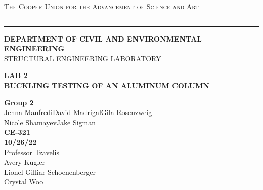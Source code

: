 \begin{titlepage}
    \begin{center}
    {{\Large{\textsc{The Cooper Union for the Advancement of Science and Art}}}} \rule[0.1cm]{15.8cm}{0.1mm}
    \rule[0.5cm]{15.8cm}{0.6mm}
    {\small{\bf DEPARTMENT OF CIVIL AND ENVIRONMENTAL ENGINEERING}}\\
    {\footnotesize{STRUCTURAL ENGINEERING LABORATORY}}
    \end{center}
    \vspace{15mm}
    \begin{center}
    {\large{\bf LAB 2\\}}
    \vspace{5mm}
    {\Large{\bf BUCKLING TESTING OF AN ALUMINUM COLUMN}}
    \end{center}
    \vspace{35mm}
    \par
    \noindent
    \hfill
    \vspace{20mm}
    \begin{center}
    {\large{ {\bf Group 2} \\ { Jenna Manfredi\hspace{5mm}David Madrigal\hspace{5mm}Gila Rosenzweig\\Nicole Shamayev\hspace{5mm}Jake Sigman}}}
    \vspace{40mm}
    {\large {\bf \\CE-321 \\ 10/26/22 \\}}
    \vspace{15mm}
    {\normalsize{Professor Tzavelis \\ Avery Kugler \\ Lionel Gilliar-Schoenenberger \\ Crystal Woo}}
    \end{center}
\end{titlepage}